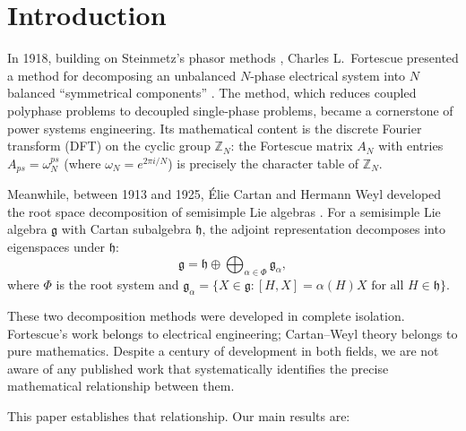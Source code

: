 \documentclass[11pt]{article}
\newcommand{\g}{\mathfrak{g}}
\newcommand{\h}{\mathfrak{h}}
\newcommand{\ZZ}{\mathbb{Z}}
\begin{document}
\section{Introduction}
\label{sec:intro}

In 1918, building on Steinmetz's phasor methods
\cite{steinmetz1893}, Charles L.\ Fortescue presented a method for
decomposing an unbalanced $N$-phase electrical system into $N$ balanced ``symmetrical
components'' \cite{fortescue1918}. The method, which reduces coupled
polyphase problems to decoupled single-phase problems, became a
cornerstone of power systems engineering. Its mathematical content is
the discrete Fourier transform (DFT) on the cyclic group $\ZZ_N$:
the Fortescue matrix $A_N$ with entries $A_{ps} = \omega_N^{ps}$
(where $\omega_N = e^{2\pi i/N}$) is precisely the character table
of $\ZZ_N$.

Meanwhile, between 1913 and 1925, \'Elie Cartan and Hermann Weyl
developed the root space decomposition of semisimple Lie algebras
\cite{cartan1913,weyl1925}. For a semisimple Lie algebra $\g$ with
Cartan subalgebra $\h$, the adjoint representation decomposes into
eigenspaces under $\h$:
\begin{equation}\label{eq:cartan-weyl}
  \g = \h \oplus \bigoplus_{\alpha \in \Phi} \g_\alpha,
\end{equation}
where $\Phi$ is the root system and $\g_\alpha = \{X \in \g : [H, X] =
\alpha(H) X \text{ for all } H \in \h\}$.

These two decomposition methods were developed in complete isolation.
Fortescue's work belongs to electrical engineering; Cartan--Weyl theory
belongs to pure mathematics. Despite a century of development in both
fields, we are not aware of any published work that systematically
identifies the precise mathematical relationship between them.

This paper establishes that relationship. Our main results are:
\end{document}

